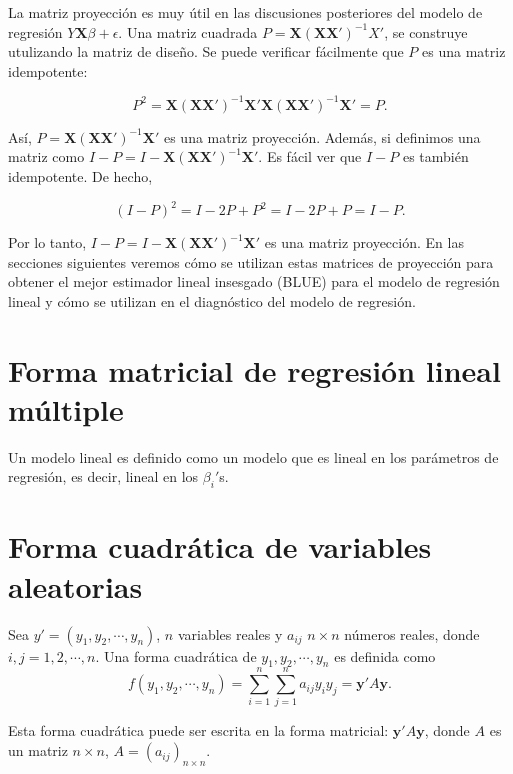 La matriz proyección es muy útil en las discusiones posteriores del modelo de regresión $Y\textbf{X}\beta+\epsilon$. Una matriz cuadrada $P=\textbf{X}(\textbf{X}\textbf{X}')^{-1}X'$, se construye utulizando la matriz de diseño. Se puede verificar fácilmente que $P$ es una matriz idempotente:

$$P^2=\textbf{X}(\textbf{X}\textbf{X}')^{-1}\textbf{X}'\textbf{X}(\textbf{X}\textbf{X}')^{-1}\textbf{X}'=P.$$

Así, $P=\textbf{X}(\textbf{X}\textbf{X}')^{-1}\textbf{X}'$ es una matriz proyección. Además, si definimos una matriz como $I-P=I-\textbf{X}(\textbf{X}\textbf{X}')^{-1}\textbf{X}'$. Es fácil ver que $I-P$ es también idempotente. De hecho,

$$(I-P)^2=I-2P+P^2=I-2P+P=I-P.$$

Por lo tanto, $I-P=I-\textbf{X}(\textbf{X}\textbf{X}')^{-1}\textbf{X}'$ es una matriz proyección. En las secciones siguientes veremos cómo se utilizan estas matrices de proyección para obtener el mejor estimador lineal insesgado (BLUE) para el modelo de regresión lineal y cómo se utilizan en el diagnóstico del modelo de regresión.


\section{Forma matricial de regresión lineal múltiple}

\begin{def.}
    Un modelo lineal es definido como un modelo que es lineal en los parámetros de regresión, es decir, lineal en los $\beta_i'$s.
\end{def.}


\section{Forma cuadrática de variables aleatorias}

\begin{def.}
    Sea $y'=(y_1,y_2,\cdots,y_n)$, $n$ variables reales y $a_{ij}$ $n\times n$ números reales, donde $i,j=1,2,\cdots,n.$ Una forma cuadrática de $y_1,y_2,\cdots,y_n$ es definida como
    $$f(y_1,y_2,\cdots,y_n)=\sum_{i=1}^n\sum_{j=1}^n a_{ij}y_iy_j=\textbf{y}'A\textbf{y}.$$
\end{def.}

Esta forma cuadrática puede ser escrita en la forma matricial: $\textbf{y}'A\textbf{y}$, donde $A$ es un matriz $n\times n$, $A=(a_{ij})_{n\times n}$.\\


